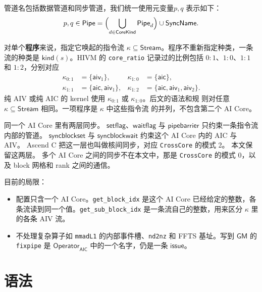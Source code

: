\documentclass[UTF8,a4paper,11pt,fontset=fandol]{ctexart}
\newcommand{\kw}[1]{\ensuremath{\mathsf{#1}}}
\begin{document}
管道名包括数据管道和同步管道，我们统一使用元变量$p,q$ 表示如下：
\begin{equation}
\label{eq:pipe}
p,q\in\mathsf{Pipe}
  =\Bigl(\bigcup_{d\in\mathsf{CoreKind}}\mathsf{Pipe}_d\Bigr)
   \cup\mathsf{SyncName}.
\end{equation}



对单个\textbf{程序}来说，指定它唤起的指令流 $\kappa\subseteq\mathsf{Stream}$。程序不重新指定种类，一条流的种类是 $\mathsf{kind}(s)$。HIVM 的 \texttt{core\_ratio} 记录过的比例包括 $0{:}1$、$1{:}0$、$1{:}1$ 和 $1{:}2$，分别对应
\[
\begin{aligned}
\kappa_{0:1}&=\{\mathsf{aiv}_1\},&
\kappa_{1:0}&=\{\mathsf{aic}\},\\
\kappa_{1:1}&=\{\mathsf{aic},\mathsf{aiv}_1\},&
\kappa_{1:2}&=\{\mathsf{aic},\mathsf{aiv}_1,\mathsf{aiv}_2\}.
\end{aligned}
\]
纯 AIV 或纯 AIC 的 kernel 使用 $\kappa_{0:1}$ 或 $\kappa_{1:0}$。后文的语法和规
则对任意 $\kappa\subseteq\mathsf{Stream}$ 相同。一项程序是 $\kappa$ 中这些指令流
的并列，不包含第二个 AI Core。

同一个 AI Core 里有两层同步。
\kw{setflag}、\kw{waitflag} 与 \kw{pipebarrier} 只约束一条指令流内部的管道。
\kw{syncblockset} 与 \kw{syncblockwait} 约束这个 AI Core 内的 AIC 与 AIV。
Ascend C 把这一层也叫做核间同步，对应 \texttt{CrossCore} 的模式 2。
本文保留这两层。
多个 AI Core 之间的同步不在本文中，那是 \texttt{CrossCore} 的模式 0，以及 block 网格和 rank 之间的通信。

目前的局限：
\begin{itemize}
\item 配置只含一个 AI Core。\texttt{get\_block\_idx} 是这个 AI Core 已经给定的整数，各条流读到同一个值。\texttt{get\_sub\_block\_idx} 是一条流自己的整数，用来区分 $\kappa$ 里的各条 AIV 流。
\item 不处理复杂算子如 \texttt{mmadL1} 的内部事件槽、\texttt{nd2nz} 和 FFTS 基址。写到 $\mathsf{GM}$ 的 \texttt{fixpipe} 是 $\mathsf{Operator}_{\mathsf{AIC}}$ 中的一个名字，仍是一条 \kw{issue}。
\end{itemize}

\section{语法}
\end{document}

